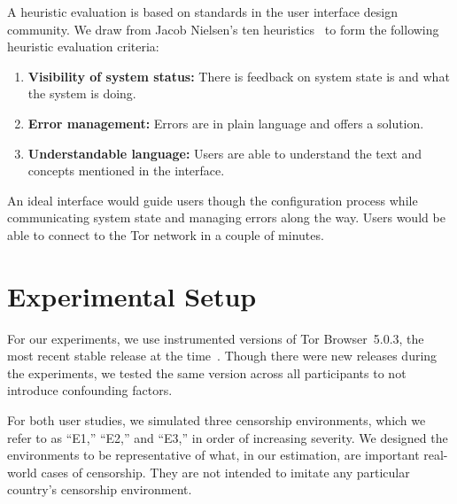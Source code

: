 \documentclass[USenglish,oneside,twocolumn]{article}
\begin{document}
A heuristic evaluation is based on standards
in the user interface design community. We draw from Jacob Nielsen's ten heuristics~\cite{nielsen1994heuristic}
to form the following heuristic evaluation criteria: \\

\begin{enumerate}
    \item  {\bfseries Visibility of system status:} There is feedback on system state is and what the system is doing. 
    \item  {\bfseries Error management:}  Errors are in plain language and offers a solution. 
    \item  {\bfseries Understandable language:} Users are able to understand the text and concepts mentioned in the interface. 
\end{enumerate}

An ideal interface would guide users though the configuration process while communicating system state and managing errors along the way. Users would be able to connect to the Tor network in a couple of minutes. 

\section{Experimental Setup}
\label{sec:environments}
For our experiments, we use instrumented versions of Tor Browser~5.0.3, 
the most recent stable release at the time~\cite{torbrowser-503}.
Though there were new releases during the experiments,
we tested the same version across all participants to not introduce
confounding factors.

For both user studies, we simulated three censorship environments,
which we refer to as ``E1,'' ``E2,'' and ``E3,'' in order of increasing severity.
We designed the environments to be representative
of what, in our estimation, are important real-world
cases of censorship. They are not intended to imitate
any particular country's censorship environment.

\smallskip

\end{document}
